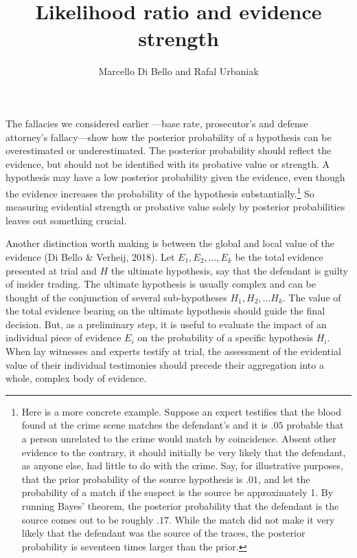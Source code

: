 \documentclass[
  10pt,
  dvipsnames,enabledeprecatedfontcommands]{scrartcl}
\title{Likelihood ratio and evidence strength}
\author{Marcello Di Bello and Rafal Urbaniak}
\date{}
\begin{document}
\maketitle

The fallacies we considered earlier ---base rate,
prosecutor's and defense attorney's fallacy---show how the posterior
probability of a hypothesis can be overestimated or underestimated. The
posterior probability should reflect the evidence, but should not be
identified with its probative value or strength. A hypothesis may have a
low posterior probability given the evidence, even though the evidence
increases the probability of the hypothesis substantially.\footnote{Here
  is a more concrete example. Suppose an expert testifies that the blood
  found at the crime scene matches the defendant's and it is \(.05\)
  probable that a person unrelated to the crime would match by
  coincidence. Absent other evidence to the contrary, it should
  initially be very likely that the defendant, as anyone else, had
  little to do with the crime. Say, for illustrative purposes, that the
  prior probability of the source hypothesis is \(.01\), and let the
  probability of a match if the suspect is the source be approximately
  1. By running Bayes' theorem, the posterior probability that the
  defendant is the source comes out to be roughly \(.17\). While the
  match did not make it very likely that the defendant was the source of
  the traces, the posterior probability is seventeen times larger than
  the prior.} So measuring evidential strength or probative value solely
by posterior probabilities leaves out something crucial.

Another distinction worth making is between the global and local value
of the evidence (Di Bello \& Verheij, 2018). Let \(E_1,E_2,\dots, E_k\)
be the total evidence presented at trial and \(H\) the ultimate
hypothesis, say that the defendant is guilty of insider trading. The
ultimate hypothesis is usually complex and can be thought of the
conjunction of several sub-hypotheses \(H_1, H_2, \dots H_k\). The value
of the total evidence bearing on the ultimate hypothesis should guide
the final decision. But, as a preliminary step, it is useful to evaluate
the impact of an individual piece of evidence \(E_i\) on the probability
of a specific hypothesis \(H_i\). When lay witnesses and experts testify
at trial, the assessment of the evidential value of their individual
testimonies should precede their aggregation into a whole, complex body
of evidence.
\end{document}

